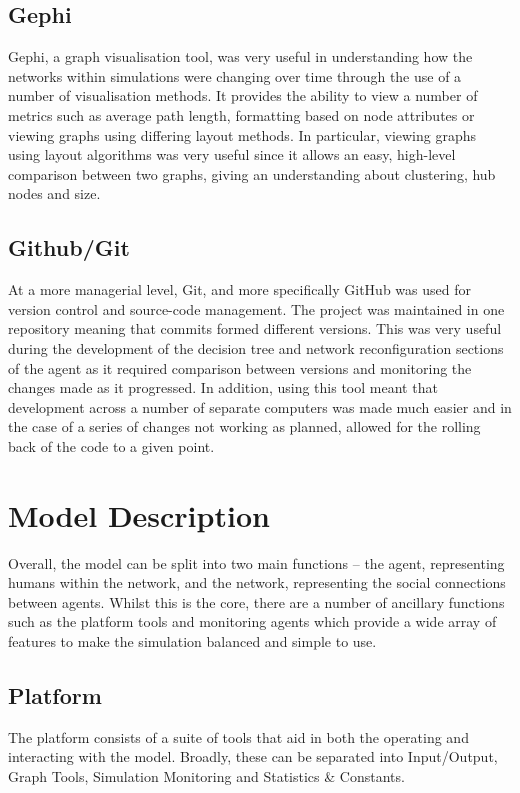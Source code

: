 \documentclass[]{report}
\begin{document}
\subsection{Gephi}
Gephi, a graph visualisation tool, was very useful in understanding how the networks within simulations were changing over time through the use of a number of visualisation methods. It provides the ability to view a number of metrics such as average path length, formatting based on node attributes or viewing graphs using differing layout methods. In particular, viewing graphs using layout algorithms was very useful since it allows an easy, high-level comparison between two graphs, giving an understanding about clustering, hub nodes and size.
 
\subsection{Github/Git}
At a more managerial level, Git, and more specifically GitHub was used for version control and source-code management. The project was maintained in one repository meaning that commits formed different versions. This was very useful during the development of the decision tree and network reconfiguration sections of the agent as it required comparison between versions and monitoring the changes made as it progressed. In addition, using this tool meant that development across a number of separate computers was made much easier and in the case of a series of changes not working as planned, allowed for the rolling back of the code to a given point.


\section{Model Description}
Overall, the model can be split into two main functions – the agent, representing humans within the network, and the network, representing the social connections between agents. Whilst this is the core, there are a number of ancillary functions such as the platform tools and monitoring agents which provide a wide array of features to make the simulation balanced and simple to use.
\subsection{Platform}
The platform consists of a suite of tools that aid in both the operating and interacting with the model. Broadly, these can be separated into Input/Output, Graph Tools, Simulation Monitoring and Statistics \& Constants. 
\end{document}
